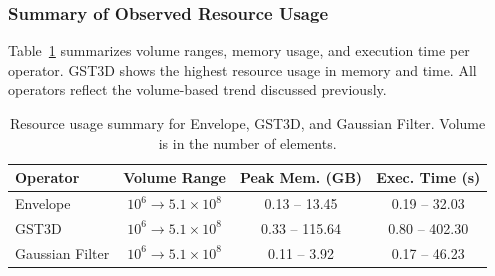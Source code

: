 \subsubsection{Summary of Observed Resource Usage}
\label{subsec:resource-usage-summary}

Table~\ref{tab:operator_summary_aggregates} summarizes volume ranges, memory usage, and execution time per operator.
\ac{GST3D} shows the highest resource usage in memory and time.
All operators reflect the volume-based trend discussed previously.

\begin{table}[htbp]
    \centering
    \begin{tabular}{lccc}
        \hline
        \textbf{Operator} & \textbf{Volume Range}    & \textbf{Peak Mem. (\ac{GB})} & \textbf{Exec. Time (s)} \\
        \hline
        Envelope          & $10^6 \to 5.1\times10^8$ & 0.13 – 13.45                 & 0.19 – 32.03            \\
        \ac{GST3D}        & $10^6 \to 5.1\times10^8$ & 0.33 – 115.64                & 0.80 – 402.30           \\
        Gaussian Filter   & $10^6 \to 5.1\times10^8$ & 0.11 – 3.92                  & 0.17 – 46.23            \\
        \hline
    \end{tabular}
    \caption{Resource usage summary for Envelope, \ac{GST3D}, and Gaussian Filter. Volume is in the number of elements.}
    \label{tab:operator_summary_aggregates}
\end{table}
